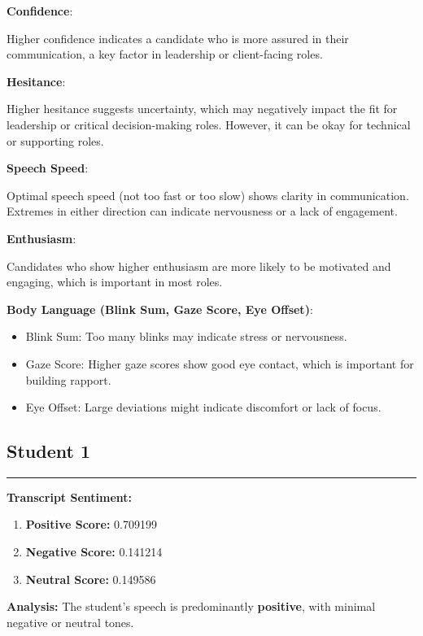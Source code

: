 \documentclass{article}
\begin{document}
\textbf{Confidence}:

Higher confidence indicates a candidate who is more assured in their communication, a key factor in leadership or client-facing roles.

\textbf{Hesitance}:


Higher hesitance suggests uncertainty, which may negatively impact the fit for leadership or critical decision-making roles. However, it can be okay for technical or supporting roles.

\textbf{Speech Speed}:

Optimal speech speed (not too fast or too slow) shows clarity in communication. Extremes in either direction can indicate nervousness or a lack of engagement.

\textbf{Enthusiasm}:

Candidates who show higher enthusiasm are more likely to be motivated and engaging, which is important in most roles.

\textbf{Body Language (Blink Sum, Gaze Score, Eye Offset)}:

\begin{itemize}
    \item Blink Sum: Too many blinks may indicate stress or nervousness.
    \item Gaze Score: Higher gaze scores show good eye contact, which is important for building rapport.
    \item Eye Offset: Large deviations might indicate discomfort or lack of focus.
\end{itemize}



\normalsize

\subsection{Student 1}
\begin{center}
    \color{green}\rule{1\linewidth}{0.7mm}
\end{center}
    \large{\textbf{Transcript Sentiment:}}
    \begin{tcolorbox}[ colback=purple!5!white,colframe=purple!75!black,   fonttitle=\bfseries, title=Sentiment Breakdown]
        \begin{enumerate}
            \item \textbf{Positive Score:} \textcolor{green!70!black}{0.709199}
            \item \textbf{Negative Score:} \textcolor{red!70!black}{0.141214}
            \item \textbf{Neutral Score:} \textcolor{blue!70!black}{0.149586}
        \end{enumerate}
    \end{tcolorbox}
        \textbf{Analysis:} The student's speech is predominantly \textbf{positive}, with minimal negative or neutral tones.
\end{document}
